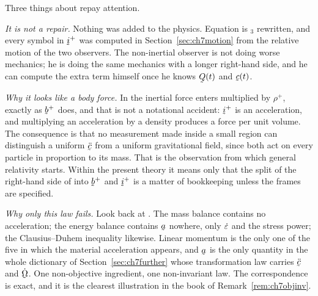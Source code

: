 \begin{remark}\label{rem:ch7inertial}
Three things about  repay attention.

\emph{It is not a repair.} Nothing was added to the physics. Equation
 is $_{3}$ rewritten, and every symbol in
$\vek{i}^{+}$ was computed in Section~\ref{sec:ch7motion} from the
relative motion of the two observers. The non-inertial observer is not
doing worse mechanics; he is doing the same mechanics with a longer
right-hand side, and he can compute the extra term himself once he knows
$\bQ(t)$ and $\bc(t)$.

\emph{Why it looks like a body force.} In  the inertial force
enters multiplied by $\rho^{+}$, exactly as $\bb^{+}$ does, and that is
not a notational accident: $\vek{i}^{+}$ is an acceleration, and
multiplying an acceleration by a density produces a force per unit
volume. The consequence is that no measurement made inside a small region
can distinguish a uniform $\ddot\bc$ from a uniform gravitational field,
since both act on every particle in proportion to its mass. That is the
observation from which general relativity starts. Within the present
theory it means only that the split of the right-hand side of 
into $\bb^{+}$ and $\vek{i}^{+}$ is a matter of bookkeeping unless the
frames are specified.

\emph{Why only this law fails.} Look back at . The mass
balance contains no acceleration; the energy balance contains $\ba$
nowhere, only $\dot{\varepsilon}$ and the stress power; the Clausius--Duhem
inequality likewise. Linear momentum is the only one of the five in which
the material acceleration appears, and $\ba$ is the only quantity in the
whole dictionary of Section~\ref{sec:ch7further} whose transformation law
carries $\ddot\bc$ and $\dot\bOm$. One non-objective ingredient, one
non-invariant law. The correspondence is exact, and it is the clearest
illustration in the book of Remark~\ref{rem:ch7objinv}.
\end{remark}

